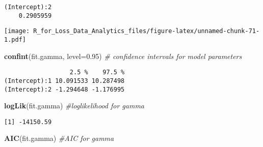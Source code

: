 \documentclass[]{book}
\newenvironment{Shaded}{\begin{snugshade}}{\end{snugshade}}
\newcommand{\KeywordTok}[1]{\textcolor[rgb]{0.13,0.29,0.53}{\textbf{#1}}}
\newcommand{\DataTypeTok}[1]{\textcolor[rgb]{0.13,0.29,0.53}{#1}}
\newcommand{\DecValTok}[1]{\textcolor[rgb]{0.00,0.00,0.81}{#1}}
\newcommand{\FloatTok}[1]{\textcolor[rgb]{0.00,0.00,0.81}{#1}}
\newcommand{\StringTok}[1]{\textcolor[rgb]{0.31,0.60,0.02}{#1}}
\newcommand{\CommentTok}[1]{\textcolor[rgb]{0.56,0.35,0.01}{\textit{#1}}}
\newcommand{\OperatorTok}[1]{\textcolor[rgb]{0.81,0.36,0.00}{\textbf{#1}}}
\newcommand{\NormalTok}[1]{#1}
\theoremstyle{definition}
\theoremstyle{definition}
\theoremstyle{definition}
\theoremstyle{remark}
\begin{document}
\begin{verbatim}
(Intercept):2 
    0.2905959 
\end{verbatim}

\begin{Shaded}
\end{Shaded}

\texttt{[image: R\_for\_Loss\_Data\_Analytics\_files/figure-latex/unnamed-chunk-71-1.pdf]}

\begin{Shaded}
\begin{Highlighting}[]
\KeywordTok{confint}\NormalTok{(fit.gamma, }\DataTypeTok{level=}\FloatTok{0.95}\NormalTok{)  }\CommentTok{# confidence intervals for model parameters }
\end{Highlighting}
\end{Shaded}

\begin{verbatim}
                  2.5 %    97.5 %
(Intercept):1 10.091533 10.287498
(Intercept):2 -1.294648 -1.176995
\end{verbatim}

\begin{Shaded}
\begin{Highlighting}[]
\KeywordTok{logLik}\NormalTok{(fit.gamma)               }\CommentTok{#loglikelihood for gamma}
\end{Highlighting}
\end{Shaded}

\begin{verbatim}
[1] -14150.59
\end{verbatim}

\begin{Shaded}
\begin{Highlighting}[]
\KeywordTok{AIC}\NormalTok{(fit.gamma)                  }\CommentTok{#AIC for gamma}
\end{Highlighting}
\end{Shaded}
\end{document}
